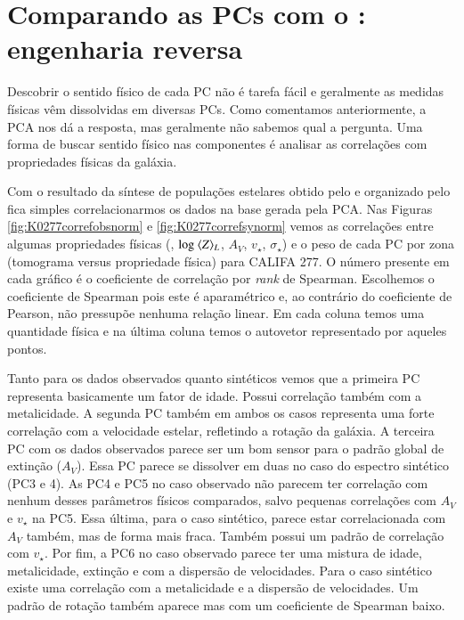 \section{Comparando as PCs com o \STARLIGHT: engenharia reversa}
\label{sec:PCAaplic:EngRev}

Descobrir o sentido físico de cada PC não é tarefa fácil e geralmente as medidas físicas vêm dissolvidas em diversas
PCs. Como comentamos anteriormente, a PCA nos dá a resposta, mas geralmente não sabemos qual a pergunta. Uma forma de
buscar sentido físico nas componentes é analisar as correlações com propriedades físicas da galáxia.

Com o resultado da síntese de populações estelares obtido pelo \starlight e organizado pelo \pycasso fica simples
correlacionarmos os dados na base gerada pela PCA. Nas Figuras \ref{fig:K0277correfobsnorm} e
\ref{fig:K0277correfsynorm} vemos as correlações entre algumas propriedades físicas (, $\log\ \meanL{Z}$,
$A_V$, $v_{\star}$, $\sigma_{\star}$) e o peso de cada PC por zona (tomograma versus propriedade física) para CALIFA
277. O número presente em cada gráfico é o coeficiente de correlação por {\em rank} de Spearman. Escolhemos o
coeficiente de Spearman pois este é aparamétrico e, ao contrário do coeficiente de Pearson, não pressupõe nenhuma
relação linear. Em cada coluna temos uma quantidade física e na última coluna temos o autovetor representado por aqueles
pontos.

Tanto para os dados observados quanto sintéticos vemos que a primeira PC representa basicamente um fator de idade.
Possui correlação também com a metalicidade. A segunda PC também em ambos os casos representa uma forte correlação com a
velocidade estelar, refletindo a rotação da galáxia. A terceira PC com os dados observados parece ser um bom sensor para
o padrão global de extinção ($A_V$). Essa PC parece se dissolver em duas no caso do espectro sintético (PC3 e 4). As PC4
e PC5 no caso observado não parecem ter correlação com nenhum desses parâmetros físicos comparados, salvo pequenas
correlações com $A_V$ e $v_\star$ na PC5. Essa última, para o caso sintético, parece estar correlacionada com $A_V$
também, mas de forma mais fraca. Também possui um padrão de correlação com $v_\star$. Por fim, a PC6 no caso observado
parece ter uma mistura de idade, metalicidade, extinção e com a dispersão de velocidades. Para o caso sintético existe
uma correlação com a metalicidade e a dispersão de velocidades. Um padrão de rotação também aparece mas com um
coeficiente de Spearman baixo.

